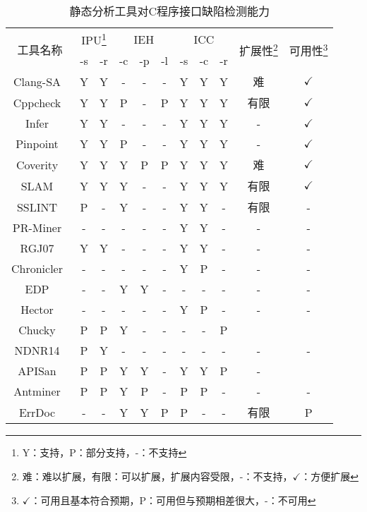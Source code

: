 \begin{table}[t]
	\centering
	\begin{minipage}[t]{0.85\linewidth} %
		\caption{静态分析工具对C程序接口缺陷检测能力}
		\label{tab:3-2-survey}
			\begin{tabular}{@{\extracolsep{3pt}}ccccccccccc@{}}
			\hline
			\multirow{2}{*}{工具名称} & \multicolumn{2}{c}{IPU\footnote{Y：支持，P：部分支持，-：不支持}} & \multicolumn{3}{c}{IEH} & \multicolumn{3}{c}{ICC} & \multirow{2}{*}{扩展性\footnote{难：难以扩展，有限：可以扩展，扩展内容受限，-：不支持，$\checkmark$：方便扩展}} & \multirow{2}{*}{可用性\footnote{$\checkmark$：可用且基本符合预期，P：可用但与预期相差很大，-：不可用}} \\
			\cline{2-3}\cline{4-6}\cline{7-9}
			 & -s & -r & -c & -p & -l & -s & -c & -r & & \\
			\hline
			Clang-SA~\cite{clang-sa} & Y & Y & - & - & - & Y & Y & Y & 难 & $\checkmark$ \\
			Cppcheck~\cite{cppcheck} & Y & Y & P & - & P & Y & Y & Y & 有限 & $\checkmark$ \\
			Infer~\cite{infer} & Y & Y & - & - & - & Y & Y & Y & - & $\checkmark$ \\
			Pinpoint~\cite{pinpoint} & Y & Y & P & - & - & Y & Y & Y & - & $\checkmark$ \\
			Coverity~\cite{coverity} & Y & Y & Y & P & P & Y & Y & Y & 难 & $\checkmark$ \\
			\hline 
			SLAM~\cite{slam} & Y & Y & Y & - & - & Y & Y & Y & 有限 & $\checkmark$ \\
			SSLINT~\cite{15-sp-sslint} & P & - & Y & - & - & Y & Y & - & 有限 & - \\
			\hline
			PR-Miner~\cite{05-fse-prminer} & - & - & - & - & - & Y & Y & - & - & - \\
			RGJ07~\cite{07-PLDI-RGJ07} & Y & Y & - & - & - & Y & Y & - & - & - \\
			Chronicler~\cite{07-icse-chronicler} & - & - & - & - & - & Y & P & - & - & - \\
			EDP~\cite{08-fast-eio} & - & - & Y & Y & - & - & - & - & - & - \\
			Hector~\cite{13-dsn-hector} & - & - & - & - & - & Y & P & - & - & - \\
			Chucky~\cite{13-ccs-chucky} & P & P & Y & - & - & - & - & P &  & \checkmark \\
			NDNR14~\cite{14-fse-pre} & P & Y & - & - & - & - & - & - & - & - \\
			APISan~\cite{16-sec-apisan} & P & P & Y & Y & - & Y & Y & P & - & \checkmark \\
			Antminer~\cite{16-icse-antminer}& P & P & Y & P & - & P & P & - & - & - \\
			ErrDoc~\cite{17-fse-errdoc}& - & - & Y & Y & P & P & - & - & 有限 & P \\
			\hline
		\end{tabular}
	\end{minipage}
\end{table}